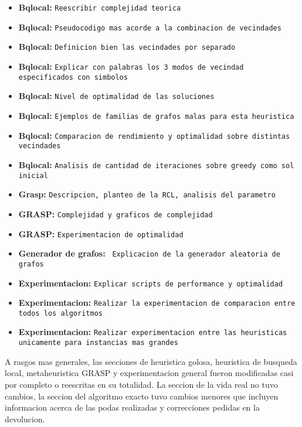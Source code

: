 \begin{itemize}
	\item \textbf{Bqlocal: } \texttt{Reescribir complejidad teorica}
	\item \textbf{Bqlocal: } \texttt{Pseudocodigo mas acorde a la combinacion de vecindades}
	\item \textbf{Bqlocal: } \texttt{Definicion bien las vecindades por separado}
	\item \textbf{Bqlocal: } \texttt{Explicar con palabras los 3 modos de vecindad especificados con simbolos}
	\item \textbf{Bqlocal: } \texttt{Nivel de optimalidad de las soluciones}
	\item \textbf{Bqlocal: } \texttt{Ejemplos de familias de grafos malas para esta heuristica}
	\item \textbf{Bqlocal: } \texttt{Comparacion de rendimiento y optimalidad sobre distintas vecindades}
	\item \textbf{Bqlocal: } \texttt{Analisis de cantidad de iteraciones sobre greedy como sol inicial}
	\item \textbf{Grasp: } \texttt{Descripcion, planteo de la RCL, analisis del parametro}
	\item \textbf{GRASP: } \texttt{Complejidad y graficos de complejidad}
	\item \textbf{GRASP: } \texttt{Experimentacion de optimalidad}
	\item \textbf{Generador de grafos: }\texttt{ Explicacion de la generador aleatoria de grafos}
	\item \textbf{Experimentacion: } \texttt{Explicar scripts de performance y optimalidad}
	\item \textbf{Experimentacion: } \texttt{Realizar la experimentacion de comparacion entre todos los algoritmos}
	\item \textbf{Experimentacion: } \texttt{Realizar experimentacion entre las heuristicas unicamente para instancias mas grandes}
\end{itemize}

A rasgos mas generales, las secciones de heuristica golosa, heuristica de busqueda local, metaheuristica GRASP y experimentacion general fueron modificadas casi por completo o reescritas en su totalidad. La seccion de la vida real no tuvo cambios, la seccion del algoritmo exacto tuvo cambios menores que incluyen informacion acerca de las podas realizadas y correcciones pedidas en la devolucion.
